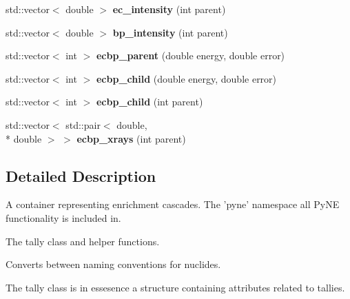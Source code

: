 \begin{DoxyCompactItemize}
\item 
\hypertarget{namespacepyne_acdd99da92f821b3634d41c217f7ba36c}{std\-::vector$<$ double $>$ {\bfseries ec\-\_\-intensity} (int parent)}\label{namespacepyne_acdd99da92f821b3634d41c217f7ba36c}

\item 
\hypertarget{namespacepyne_ae90f342a67b82fd077368de131ad511f}{std\-::vector$<$ double $>$ {\bfseries bp\-\_\-intensity} (int parent)}\label{namespacepyne_ae90f342a67b82fd077368de131ad511f}

\item 
\hypertarget{namespacepyne_a02be9a4983e3e83032e61aa37477b10f}{std\-::vector$<$ int $>$ {\bfseries ecbp\-\_\-parent} (double energy, double error)}\label{namespacepyne_a02be9a4983e3e83032e61aa37477b10f}

\item 
\hypertarget{namespacepyne_ac59bf74785aa6b188506174de3b2ce53}{std\-::vector$<$ int $>$ {\bfseries ecbp\-\_\-child} (double energy, double error)}\label{namespacepyne_ac59bf74785aa6b188506174de3b2ce53}

\item 
\hypertarget{namespacepyne_a2262ce3daa576a7bd988583ee2e9cbca}{std\-::vector$<$ int $>$ {\bfseries ecbp\-\_\-child} (int parent)}\label{namespacepyne_a2262ce3daa576a7bd988583ee2e9cbca}

\item 
\hypertarget{namespacepyne_a2534b5faa411582a7b6829c9bd54224d}{std\-::vector$<$ std\-::pair$<$ double, \\*
double $>$ $>$ {\bfseries ecbp\-\_\-xrays} (int parent)}\label{namespacepyne_a2534b5faa411582a7b6829c9bd54224d}

\end{DoxyCompactItemize}


\subsection{Detailed Description}
A container representing enrichment cascades. The 'pyne' namespace all Py\-N\-E functionality is included in.

The tally class and helper functions.

Converts between naming conventions for nuclides.

The tally class is in essesence a structure containing attributes related to tallies. 

